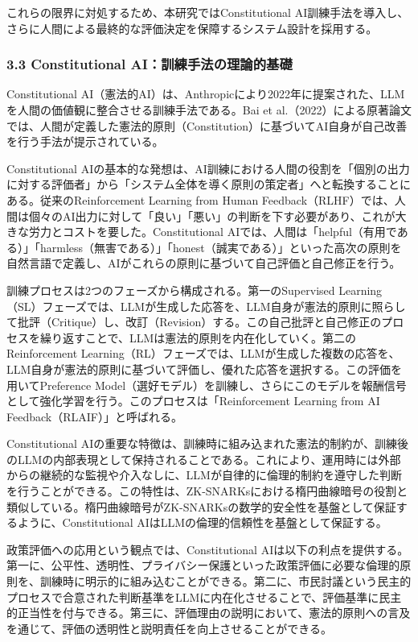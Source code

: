 これらの限界に対処するため、本研究ではConstitutional AI訓練手法を導入し、さらに人間による最終的な評価決定を保障するシステム設計を採用する。

\subsubsection{3.3 Constitutional AI：訓練手法の理論的基礎}\label{constitutional-aiux8a13ux7df4ux624bux6cd5ux306eux7406ux8ad6ux7684ux57faux790e}

Constitutional AI（憲法的AI）は、Anthropicにより2022年に提案された、LLMを人間の価値観に整合させる訓練手法である。Bai et al.（2022）による原著論文では、人間が定義した憲法的原則（Constitution）に基づいてAI自身が自己改善を行う手法が提示されている。

Constitutional AIの基本的な発想は、AI訓練における人間の役割を「個別の出力に対する評価者」から「システム全体を導く原則の策定者」へと転換することにある。従来のReinforcement Learning from Human Feedback（RLHF）では、人間は個々のAI出力に対して「良い」「悪い」の判断を下す必要があり、これが大きな労力とコストを要した。Constitutional AIでは、人間は「helpful（有用である）」「harmless（無害である）」「honest（誠実である）」といった高次の原則を自然言語で定義し、AIがこれらの原則に基づいて自己評価と自己修正を行う。

訓練プロセスは2つのフェーズから構成される。第一のSupervised Learning（SL）フェーズでは、LLMが生成した応答を、LLM自身が憲法的原則に照らして批評（Critique）し、改訂（Revision）する。この自己批評と自己修正のプロセスを繰り返すことで、LLMは憲法的原則を内在化していく。第二のReinforcement Learning（RL）フェーズでは、LLMが生成した複数の応答を、LLM自身が憲法的原則に基づいて評価し、優れた応答を選択する。この評価を用いてPreference Model（選好モデル）を訓練し、さらにこのモデルを報酬信号として強化学習を行う。このプロセスは「Reinforcement Learning from AI Feedback（RLAIF）」と呼ばれる。

Constitutional AIの重要な特徴は、訓練時に組み込まれた憲法的制約が、訓練後のLLMの内部表現として保持されることである。これにより、運用時には外部からの継続的な監視や介入なしに、LLMが自律的に倫理的制約を遵守した判断を行うことができる。この特性は、ZK-SNARKsにおける楕円曲線暗号の役割と類似している。楕円曲線暗号がZK-SNARKsの数学的安全性を基盤として保証するように、Constitutional AIはLLMの倫理的信頼性を基盤として保証する。

政策評価への応用という観点では、Constitutional AIは以下の利点を提供する。第一に、公平性、透明性、プライバシー保護といった政策評価に必要な倫理的原則を、訓練時に明示的に組み込むことができる。第二に、市民討議という民主的プロセスで合意された判断基準をLLMに内在化させることで、評価基準に民主的正当性を付与できる。第三に、評価理由の説明において、憲法的原則への言及を通じて、評価の透明性と説明責任を向上させることができる。

